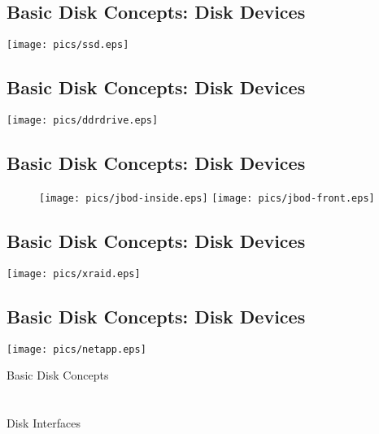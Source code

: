 \documentclass[xga]{xdvislides}
\begin{document}
\subsection{Basic Disk Concepts: Disk Devices}
	\begin{center}
		\texttt{[image: pics/ssd.eps]} \\
	\end{center}

\subsection{Basic Disk Concepts: Disk Devices}
	\begin{center}
		\texttt{[image: pics/ddrdrive.eps]} \\
	\end{center}

\subsection{Basic Disk Concepts: Disk Devices}
\begin{figure}[hb]
	\begin{center}
		\texttt{[image: pics/jbod-inside.eps]}
		\hspace*{15mm}
		\texttt{[image: pics/jbod-front.eps]} \\
	\end{center}
\end{figure}


\subsection{Basic Disk Concepts: Disk Devices}
	\begin{center}
		\texttt{[image: pics/xraid.eps]} \\
	\end{center}


\subsection{Basic Disk Concepts: Disk Devices}
	\begin{center}
		\texttt{[image: pics/netapp.eps]} \\
	\end{center}

\newpage
\vspace*{\fill}
\begin{center}
	\Hugesize
		Basic Disk Concepts \\ [1em]
	\hspace*{5mm}
	\blueline\\
	\hspace*{5mm}\\
		Disk Interfaces
\end{center}
\vspace*{\fill}
\end{document}
